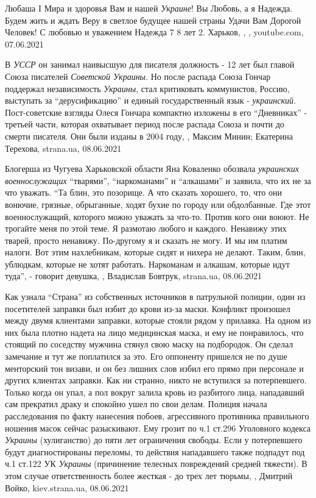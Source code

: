 Любаша I Мира и здоровья Вам и нашей \emph{Украине}! Вы Любовь, а я Надежда. Будем
жить и ждать Веру в светлое будущее нашей страны Удачи Вам Дорогой Человек! С
любовью и уважением Надежда 7 8 лет 2. Харьков,
, 
,
youtube.com, 07.06.2021

В \emph{УССР} он занимал наивысшую для писателя должность - 12 лет был главой Союза
писателей \emph{Советской Украины}. Но после распада Союза Гончар поддержал
независимость \emph{Украины}, стал критиковать коммунистов, Россию, выступать за
\enquote{дерусификацию} и единый государственный язык - \emph{украинский}.  Пост-советские
взгляды Олеся Гончара компактно изложены в его \enquote{Дневниках} - третьей части,
которая охватывает период после распада Союза и почти до смерти писателя. Они
были изданы в 2004 году,
,
Максим Минин; Екатерина Терехова, strana.ua, 08.06.2021

Блогерша из Чугуева Харьковской области Яна Коваленко обозвала \emph{украинских
военнослужащих} \enquote{тварями}, \enquote{наркоманами} и \enquote{алкашами} и
заявила, что их не за что уважать. \enquote{Та блин, это позорище. А что
сказать хорошего, то, что они вонючие, грязные, обрыганные, ходят бухие по
городу или обдолбанные. Где этот военнослужащий, которого можно уважать за
что-то.  Против кого они воюют. Не трогайте меня по этой теме. Я размотаю
любого и каждого. Ненавижу этих тварей, просто ненавижу. По-другому я и сказать
не могу. И мы им платим налоги. Вот этим нахлебникам, которые сидят и нихера не
делают.  Таким, блин, ублюдкам, которые не хотят работать. Наркоманам и
алкашам, которые идут туда}, - говорит девушка,
, Владислав Бовтрук, strana.ua, 08.06.2021

Как узнала \enquote{Страна} из собственных источников в патрульной полиции,
один из посетителей заправки был избит до крови из-за маски.  Конфликт
произошел между двумя клиентами заправки, которые стояли рядом у прилавка. На
одном из них была плотно надета на лицо медицинская маска, и ему не
понравилось, что стоящий по соседству мужчина стянул свою маску на подбородок.
Он сделал замечание и тут же поплатился за это. Его оппоненту пришелся не по
душе менторский тон визави, и он без лишних слов избил его прямо при персонале
и других клиентах заправки.  Как ни странно, никто не вступился за
потерпевшего. Только когда он упал, а пол вокруг залила кровь из разбитого
лица, нападавший сам прекратил драку и спокойно ушел по свои делам.  Полиция
начала расследования по факту нанесения побоев, агрессивного противника
правильного ношения масок сейчас разыскивают.  Ему грозит по ч.1 ст.296
Уголовного кодекса \emph{Украины} (хулиганство) до пяти лет ограничения
свободы. Если у потерпевшего будут диагностированы переломы, то действия
нападавшего также подпадут под ч.1 ст.122 УК \emph{Украины} (причинение
телесных повреждений средней тяжести). В этом случае ответственность более
жесткая - до трех лет тюрьмы,
, Дмитрий Войко, kiev.strana.ua, 08.06.2021

